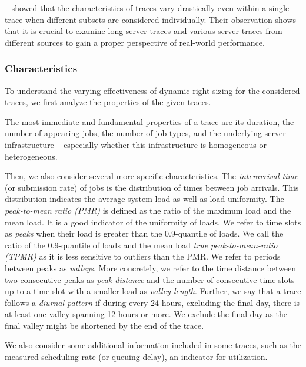 \citeauthor*{Amvrosiadis2018}~\cite{Amvrosiadis2018} showed that the characteristics of traces vary drastically even within a single trace when different subsets are considered individually. Their observation shows that it is crucial to examine long server traces and various server traces from different sources to gain a proper perspective of real-world performance.

\subsubsection{Characteristics}

To understand the varying effectiveness of dynamic right-sizing for the considered traces, we first analyze the properties of the given traces.

The most immediate and fundamental properties of a trace are its duration, the number of appearing jobs, the number of job types, and the underlying server infrastructure -- especially whether this infrastructure is homogeneous or heterogeneous.

Then, we also consider several more specific characteristics. The \emph{interarrival time} (or submission rate) of jobs is the distribution of times between job arrivals. This distribution indicates the average system load as well as load uniformity. The \emph{peak-to-mean ratio (PMR)} is defined as the ratio of the maximum load and the mean load. It is a good indicator of the uniformity of loads. We refer to time slots as \emph{peaks} when their load is greater than the 0.9-quantile of loads. We call the ratio of the 0.9-quantile of loads and the mean load \emph{true peak-to-mean-ratio (TPMR)} as it is less sensitive to outliers than the PMR. We refer to periods between peaks as \emph{valleys}. More concretely, we refer to the time distance between two consecutive peaks as \emph{peak distance} and the number of consecutive time slots up to a time slot with a smaller load as \emph{valley length}. Further, we say that a trace follows a \emph{diurnal pattern} if during every 24 hours, excluding the final day, there is at least one valley spanning 12 hours or more. We exclude the final day as the final valley might be shortened by the end of the trace.

We also consider some additional information included in some traces, such as the measured scheduling rate (or queuing delay), an indicator for utilization.

